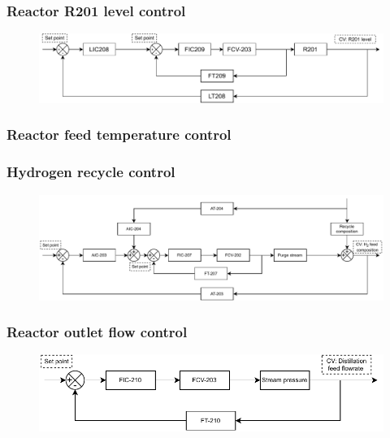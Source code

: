 \subsubsection{Reactor R201 level control}
\begin{figure}[H]
    \centering
    \includegraphics[width=\linewidth]{chapters/4-operation-control/4-Figures/R201-LC.pdf}
    \caption{}
    \label{fig:R201-LC}
\end{figure}

\subsubsection{Reactor feed temperature control}

\subsubsection{Hydrogen recycle control}
\begin{figure}[H]
    \centering
    \includegraphics[width=\linewidth]{chapters/4-operation-control/4-Figures/V202-CC.pdf}
    \caption{}
    \label{fig:V202-CC}
\end{figure}

\subsubsection{Reactor outlet flow control}
\begin{figure}[H]
    \centering
    \includegraphics[width=\linewidth]{chapters/4-operation-control/4-Figures/V201-FC.pdf}
    \caption{}
    \label{fig:V201-FC}
\end{figure}


